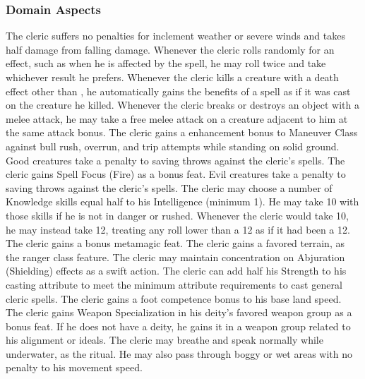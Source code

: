 \subsubsection{Domain Aspects}\label{Domain Aspects}

 The cleric suffers no penalties for inclement weather or severe winds and takes half damage from falling damage.
 Whenever the cleric rolls randomly for an effect, such as when he is affected by the  spell, he may roll twice and take whichever result he prefers.
 Whenever the cleric kills a creature with a death effect other than , he automatically gains the benefits of a  spell as if it was cast on the creature he killed.
 Whenever the cleric breaks or destroys an object with a melee attack, he may take a free melee attack on a creature adjacent to him at the same attack bonus.
 The cleric gains a  enhancement bonus to Maneuver Class against bull rush, overrun, and trip attempts while standing on solid ground.
 Good creatures take a  penalty to saving throws against the cleric's spells.
 The cleric gains Spell Focus (Fire) as a bonus feat.
 Evil creatures take a  penalty to saving throws against the cleric's spells.
 The cleric may choose a number of Knowledge skills equal half to his Intelligence (minimum 1). He may take 10 with those skills if he is not in danger or rushed.
 Whenever the cleric would take 10, he may instead take 12, treating any roll lower than a 12 as if it had been a 12.
 The cleric gains a bonus metamagic feat.
 The cleric gains a favored terrain, as the ranger class feature.
 The cleric may maintain concentration on Abjuration (Shielding) effects as a swift action.
 The cleric can add half his Strength to his casting attribute to meet the minimum attribute requirements to cast general cleric spells.
 The cleric gains a  foot competence bonus to his base land speed.
 The cleric gains Weapon Specialization in his deity's favored weapon group as a bonus feat. If he does not have a deity, he gains it in a weapon group related to his alignment or ideals.
 The cleric may breathe and speak normally while underwater, as the  ritual. He may also pass through boggy or wet areas with no penalty to his movement speed.

